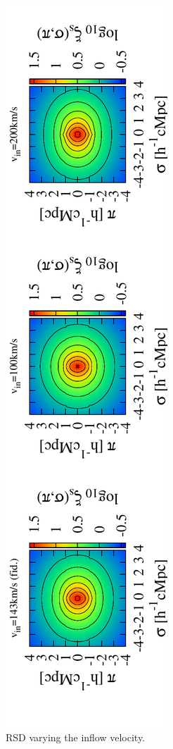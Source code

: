\documentclass[useAMS,usenatbib,twocolumn]{mn2e}
\begin{document}
\begin{figure}
\begin{center}
  \includegraphics[angle=-90,width=\textwidth]{figure/RSDs_1-4-5.pdf}
  \caption{RSD varying the inflow velocity.}\label{RSD_inflow}
 \end{center}
\end{figure}
\end{document}
